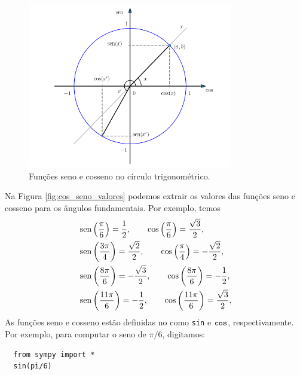 \begin{figure}[H]
  \centering
  \includegraphics[width=0.8\textwidth]{./cap_funcao/dados/fig_cos_seno/fig_cos_seno}
  \caption{Funções seno e cosseno no círculo trigonométrico.}
  \label{fig:cos_seno}
\end{figure}

Na Figura \ref{fig:cos_seno_valores} podemos extrair os valores das funções seno e cosseno para os ângulos fundamentais. Por exemplo, temos
\begin{align}
  &\operatorname{sen}\left(\frac{\pi}{6}\right) = \frac{1}{2},\qquad \cos\left(\frac{\pi}{6}\right) = \frac{\sqrt{3}}{2},\\
  &\operatorname{sen}\left(\frac{3\pi}{4}\right) = \frac{\sqrt{2}}{2},\qquad \cos\left(\frac{\pi}{4}\right) = -\frac{\sqrt{2}}{2},\\
  &\operatorname{sen}\left(\frac{8\pi}{6}\right) = -\frac{\sqrt{3}}{2},\qquad \cos\left(\frac{8\pi}{6}\right) = -\frac{1}{2},\\
  &\operatorname{sen}\left(\frac{11\pi}{6}\right) = -\frac{1}{2},\qquad \cos\left(\frac{11\pi}{6}\right) = \frac{\sqrt{3}}{2},\\
\end{align}
\ifispython
As funções seno e cosseno estão definidas no {\sympy} como \verb+sin+ e $\verb+cos+$, respectivamente. Por exemplo, para computar o seno de $\pi/6$, digitamos:
\begin{lstlisting}
  from sympy import *
  sin(pi/6)
\end{lstlisting}
\fi

